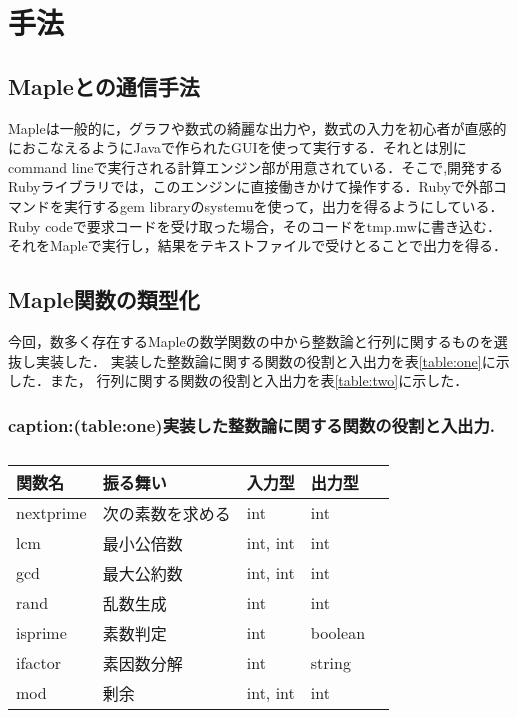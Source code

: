 \section{手法}
\subsection{Mapleとの通信手法}
Mapleは一般的に，グラフや数式の綺麗な出力や，数式の入力を初心者が直感的におこなえるようにJavaで作られたGUIを使って実行する．それとは別にcommand lineで実行される計算エンジン部が用意されている．そこで,開発するRubyライブラリでは，このエンジンに直接働きかけて操作する．Rubyで外部コマンドを実行するgem libraryのsystemuを使って，出力を得るようにしている．Ruby codeで要求コードを受け取った場合，そのコードをtmp.mwに書き込む．それをMapleで実行し，結果をテキストファイルで受けとることで出力を得る．

\subsection{Maple関数の類型化}
今回，数多く存在するMapleの数学関数の中から整数論と行列に関するものを選抜し実装した．
実装した整数論に関する関数の役割と入出力を表\ref{table:one}に示した．また，
行列に関する関数の役割と入出力を表\ref{table:two}に示した．

\subsubsection{caption:(table:one)実装した整数論に関する関数の役割と入出力.}
\begin{table}[htbp]\begin{center}
\caption{}
\begin{tabular}{lllll}
\hline
関数名  &振る舞い  &入力型  &出力型  \\ \hline
nextprime  &次の素数を求める  &int  &int  \\
lcm  &最小公倍数  &int, int  &int  \\
gcd  &最大公約数  &int, int  &int  \\
rand  &乱数生成  &int  &int  \\
isprime  &素数判定  &int  &boolean  \\
ifactor  &素因数分解  &int  &string  \\
mod  &剰余  &int, int  &int  \\
\hline
\end{tabular}
\label{default}
\end{center}\end{table}

